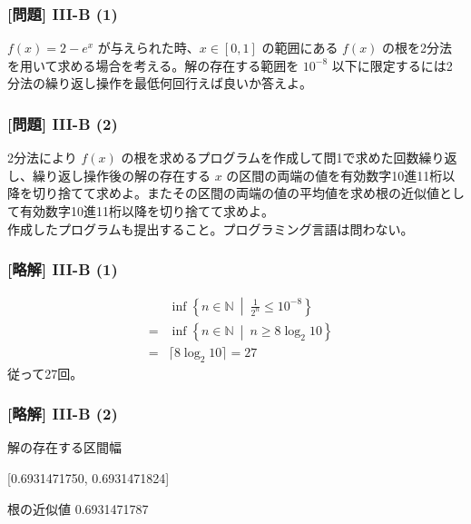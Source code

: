 \documentclass[dvipdfmx,aspectratio=169,20pt]{beamer}
\newcommand{\myfontsetting}[3]{{\fontsize{#1}{#2}\selectfont #3}}
\begin{document}
\graphicspath{{figs/}}

\begin{frame}
\frametitle{[問題] I\hspace{-.1em}I\hspace{-.1em}I-B (1)}
\myfontsetting{18pt}{20pt}{
$f(x)=2-e^{x}$ が与えられた時、$x\in [0,1]$ の範囲にある $f(x)$ の根を2分法を用いて求める場合を考える。解の存在する範囲を $10^{-8}$ 以下に限定するには2分法の繰り返し操作を最低何回行えば良いか答えよ。%
}
\end{frame}
\begin{frame}
\frametitle{[問題] I\hspace{-.1em}I\hspace{-.1em}I-B (2)}
\myfontsetting{18pt}{20pt}{
2分法により $f(x)$ の根を求めるプログラムを作成して問1で求めた回数繰り返し、繰り返し操作後の解の存在する $x$ の区間の両端の値を有効数字10進11桁以降を切り捨てて求めよ。またその区間の両端の値の平均値を求め根の近似値として有効数字10進11桁以降を切り捨てて求めよ。
}\\
\myfontsetting{12pt}{14pt}{
作成したプログラムも提出すること。プログラミング言語は問わない。
}
\end{frame}
\begin{frame}
\frametitle{[略解] I\hspace{-.1em}I\hspace{-.1em}I-B (1)}
\vspace{-0.5cm}
\begin{eqnarray*}
    &&\inf \left\{n\in \mathbb{N}\  \middle| \ \frac{1}{2^n}\le 10^{-8} \right\}\\
    &=& \inf \left\{n\in \mathbb{N}\  \middle| \ n \ge 8\log_2 10 \right\}\\
    &=& \lceil 8\log_2 10 \rceil= 27
\end{eqnarray*}
従って27回。
\end{frame}
\begin{frame}
\frametitle{[略解] I\hspace{-.1em}I\hspace{-.1em}I-B (2)}
\vspace{-0.5cm}
解の存在する区間幅

[0.6931471750, 0.6931471824]

\vspace{0.5cm}
根の近似値 0.6931471787

\end{frame}
\end{document}
